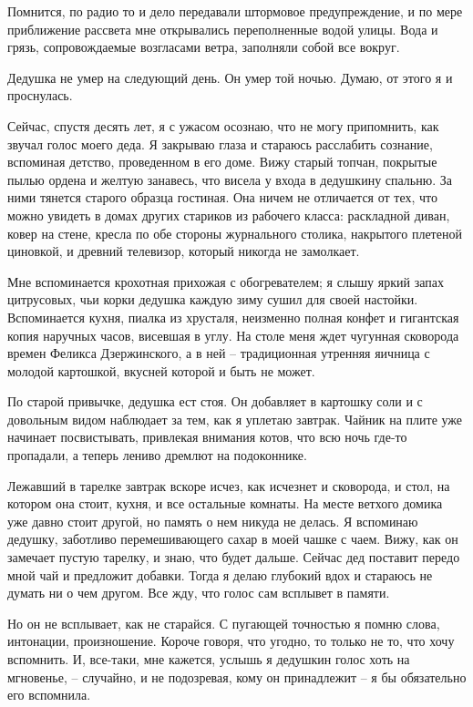 \documentclass[
]{book}
\begin{document}
Помнится, по радио то и дело передавали штормовое предупреждение, и по мере приближение рассвета мне открывались переполненные водой улицы. Вода и грязь, сопровождаемые возгласами ветра, заполняли собой все вокруг.

Дедушка не умер на следующий день. Он умер той ночью. Думаю, от этого я и проснулась.

Сейчас, спустя десять лет, я с ужасом осознаю, что не могу припомнить, как звучал голос моего деда. Я закрываю глаза и стараюсь расслабить сознание, вспоминая детство, проведенном в его доме. Вижу старый топчан, покрытые пылью ордена и желтую занавесь, что висела у входа в дедушкину спальню. За ними тянется старого образца гостиная. Она ничем не отличается от тех, что можно увидеть в домах других стариков из рабочего класса: раскладной диван, ковер на стене, кресла по обе стороны журнального столика, накрытого плетеной циновкой, и древний телевизор, который никогда не замолкает.

Мне вспоминается крохотная прихожая с обогревателем; я слышу яркий запах цитрусовых, чьи корки дедушка каждую зиму сушил для своей настойки. Вспоминается кухня, пиалка из хрусталя, неизменно полная конфет и гигантская копия наручных часов, висевшая в углу. На столе меня ждет чугунная сковорода времен Феликса Дзержинского, а в ней -- традиционная утренняя яичница с молодой картошкой, вкусней которой и быть не может.

По старой привычке, дедушка ест стоя. Он добавляет в картошку соли и с довольным видом наблюдает за тем, как я уплетаю завтрак. Чайник на плите уже начинает посвистывать, привлекая внимания котов, что всю ночь где-то пропадали, а теперь лениво дремлют на подоконнике.

Лежавший в тарелке завтрак вскоре исчез, как исчезнет и сковорода, и стол, на котором она стоит, кухня, и все остальные комнаты. На месте ветхого домика уже давно стоит другой, но память о нем никуда не делась. Я вспоминаю дедушку, заботливо перемешивающего сахар в моей чашке с чаем. Вижу, как он замечает пустую тарелку, и знаю, что будет дальше. Сейчас дед поставит передо мной чай и предложит добавки. Тогда я делаю глубокий вдох и стараюсь не думать ни о чем другом. Все жду, что голос сам всплывет в памяти.

Но он не всплывает, как не старайся. С пугающей точностью я помню слова, интонации, произношение. Короче говоря, что угодно, то только не то, что хочу вспомнить. И, все-таки, мне кажется, услышь я дедушкин голос хоть на мгновенье, -- случайно, и не подозревая, кому он принадлежит -- я бы обязательно его вспомнила.
\end{document}
